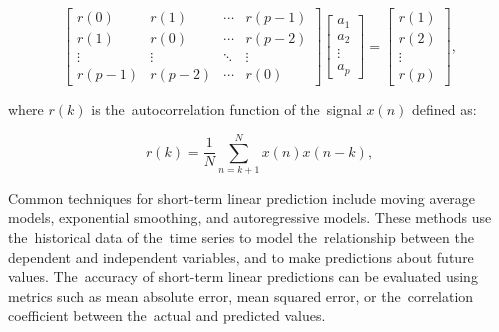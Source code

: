 \begin{equation}
  \begin{bmatrix}
    r(0) & r(1) & \cdots & r(p-1) \\
    r(1) & r(0) & \cdots & r(p-2) \\
    \vdots & \vdots & \ddots & \vdots \\
    r(p-1) & r(p-2) & \cdots & r(0)
  \end{bmatrix}
  \begin{bmatrix}
    a_1 \\
    a_2 \\
    \vdots \\
    a_p
  \end{bmatrix}
  =
  \begin{bmatrix}
    r(1) \\
    r(2) \\
    \vdots \\
    r(p)
  \end{bmatrix},
  \label{eq:matrix-equation}
\end{equation}

where $r(k)$ is the~autocorrelation function of the~signal $x(n)$ defined as:

\begin{equation}
  r(k) = \frac{1}{N} \sum_{n=k+1}^{N} x(n) x(n-k),
  \label{eq:autocorrelation}
\end{equation}

Common techniques for short-term linear prediction include moving average models, exponential smoothing, and
autoregressive models. These methods use the~historical data of the~time series to model the~relationship between the
dependent and independent variables, and to make predictions about future values. The~accuracy of short-term linear
predictions can be evaluated using metrics such as mean absolute error, mean squared error, or the~correlation
coefficient between the~actual and predicted values.


